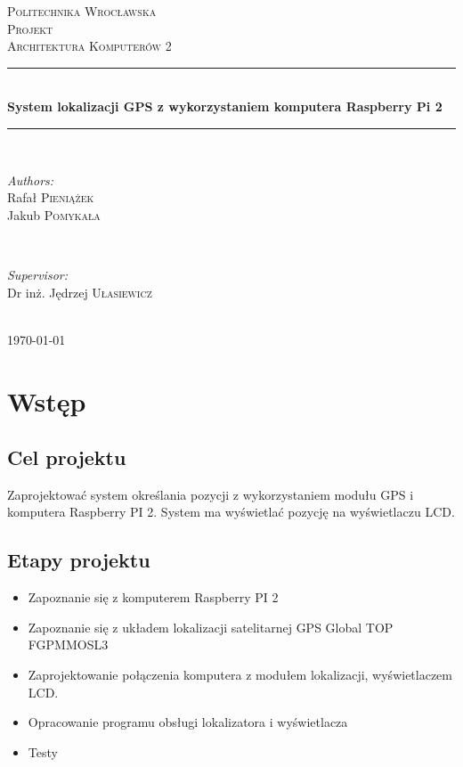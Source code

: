 \documentclass{article}
\begin{document}
	
	\begin{titlepage}
		\center
		\newcommand{\HRule}{\rule{\linewidth}{0.5mm}}
		
		\textsc{\LARGE Politechnika Wrocławska}\\[1.5cm]
		\textsc{\Large Projekt}\\[0.5cm] 
		\textsc{\large Architektura Komputerów 2}\\[0.5cm] 

		\HRule \\[0.4cm]
		{ \huge \bfseries System lokalizacji GPS z wykorzystaniem komputera Raspberry Pi 2}\\[0.4cm]
		\HRule \\[1.5cm]
		
		\begin{minipage}{0.4\textwidth}
			\begin{flushleft} \large
				\emph{Authors:}\\
				Rafał \textsc{Pieniążek} 
				\\ Jakub \textsc{Pomykała}
			\end{flushleft}
		\end{minipage}
		~
		\begin{minipage}{0.4\textwidth}
			\begin{flushright} \large
				\emph{Supervisor:} \\
				Dr inż. Jędrzej \textsc{Ułasiewicz} 
			\end{flushright}
		\end{minipage}\\[4cm]

		{\large \today}\\[3cm]
		
		\vfill
		
	\end{titlepage}

\newpage
	
\section{Wstęp}
	\subsection{Cel projektu}
	Zaprojektować system określania pozycji z wykorzystaniem modułu GPS i komputera Raspberry PI 2. System ma wyświetlać pozycję na wyświetlaczu LCD.
	\subsection {Etapy projektu}
	\begin{itemize}
	\item Zapoznanie się z komputerem Raspberry PI 2
	\item Zapoznanie się z układem lokalizacji satelitarnej GPS Global TOP FGPMMOSL3
	\item Zaprojektowanie połączenia komputera z  modułem lokalizacji, wyświetlaczem LCD.
	\item Opracowanie programu obsługi lokalizatora i wyświetlacza
	\item Testy
	\end{itemize}
\end{document}
